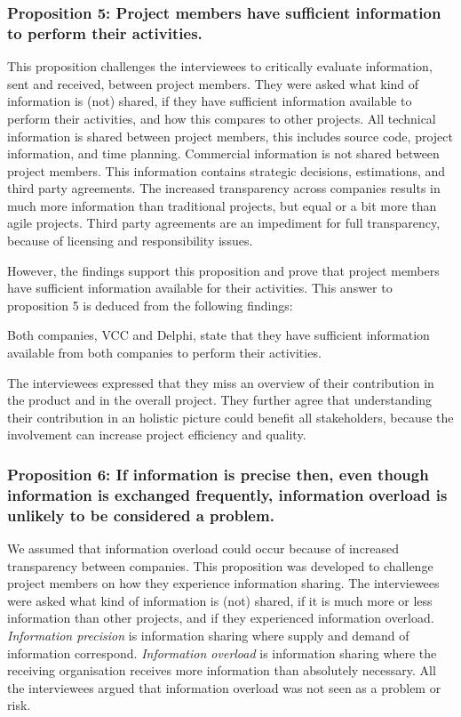 \subsubsection{Proposition 5: Project members have sufficient information to perform their activities.}

This proposition challenges the interviewees to critically evaluate information, sent and received, between project members. They were asked what kind of information is (not) shared, if they have sufficient information available to perform their activities, and how this compares to other projects. All technical information is shared between project members, this includes source code, project information, and time planning. Commercial information is not shared between project members. This information contains strategic decisions, estimations, and third party agreements. The increased transparency across companies results in much more information than traditional projects, but equal or a bit more than agile projects. Third party agreements are an impediment for full transparency, because of licensing and responsibility issues.

However, the findings support this proposition and prove that project members have sufficient information available for their activities. This answer to proposition 5 is deduced from the following findings:

 Both companies, VCC and Delphi, state that they have sufficient information available from both companies to perform their activities. 

 The interviewees expressed that they miss an overview of their contribution in the product and in the overall project. They further agree that understanding their contribution in an holistic picture could benefit all stakeholders, because the involvement can increase project efficiency and quality.

\subsubsection{Proposition 6: If information is precise then, even though information is exchanged frequently, information overload is unlikely to be considered a problem.}

We assumed that information overload could occur because of increased transparency between companies. This proposition was developed to challenge project members on how they experience information sharing. The interviewees were asked what kind of information is (not) shared, if it is much more or less information than other projects, and if they experienced information overload. {\em Information precision} is information sharing where supply and demand of information correspond. {\em Information overload} is information sharing where the receiving organisation receives more information than absolutely necessary. All the interviewees argued that information overload was not seen as a problem or risk.

